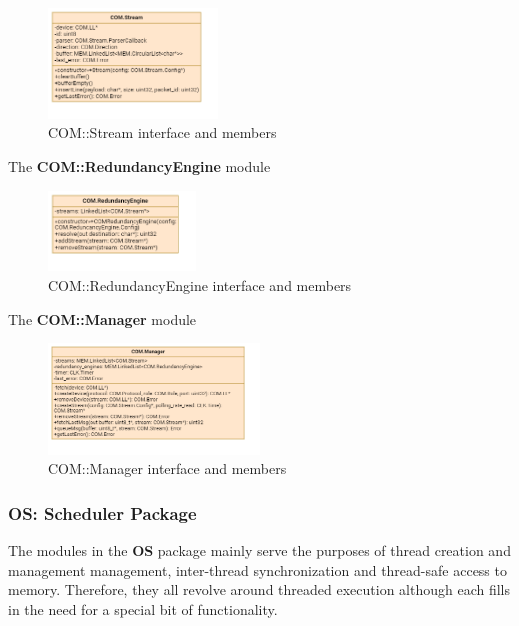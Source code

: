 \begin{figure}[H]
	\centering
	\includegraphics[width=0.4\textwidth]{./img/navig-class-stream.png}
	\caption {COM::Stream interface and members}
	\label{fig:navig-class-stream}
	\end{figure}


The \textbf{COM::RedundancyEngine} module 

\begin{figure}[H]
	\centering
	\includegraphics[width=0.35\textwidth]{./img/navig-class-redundancy-engine.png}
	\caption {COM::RedundancyEngine interface and members}
	\label{fig:navig-class-redundancy-engine}
	\end{figure}


The \textbf{COM::Manager} module 
	
\begin{figure}[H]
	\centering
	\includegraphics[width=0.5\textwidth]{./img/navig-class-manager.png}
	\caption {COM::Manager interface and members}
	\label{fig:navig-class-manager}
	\end{figure}



\subsubsection{OS: Scheduler Package}

The modules in the \textbf{OS} package mainly serve the purposes of thread creation and management management, inter-thread synchronization and thread-safe access to memory. Therefore, they all revolve around threaded execution although each fills in the need for a special bit of functionality.

